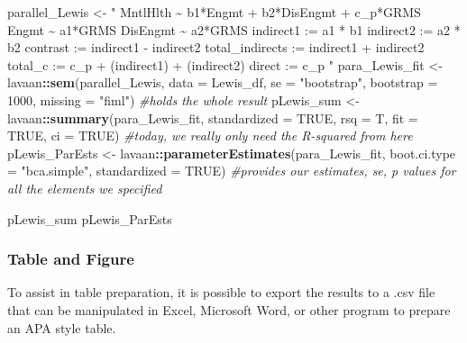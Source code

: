 \documentclass[
  11pt,
]{book}
\newenvironment{Shaded}{\begin{snugshade}}{\end{snugshade}}
\newcommand{\AttributeTok}[1]{\textcolor[rgb]{0.27,0.27,0.27}{#1}}
\newcommand{\CommentTok}[1]{\textcolor[rgb]{0.37,0.37,0.37}{\textit{#1}}}
\newcommand{\ConstantTok}[1]{\textcolor[rgb]{0.37,0.37,0.37}{#1}}
\newcommand{\DecValTok}[1]{\textcolor[rgb]{0.06,0.06,0.06}{#1}}
\newcommand{\FunctionTok}[1]{\textcolor[rgb]{0.27,0.27,0.27}{\textbf{#1}}}
\newcommand{\NormalTok}[1]{#1}
\newcommand{\OtherTok}[1]{\textcolor[rgb]{0.37,0.37,0.37}{#1}}
\newcommand{\SpecialCharTok}[1]{\textcolor[rgb]{0.43,0.43,0.43}{\textbf{#1}}}
\newcommand{\StringTok}[1]{\textcolor[rgb]{0.5,0.5,0.5}{#1}}
\begin{document}
\begin{Shaded}
\begin{Highlighting}[]
\NormalTok{parallel\_Lewis }\OtherTok{\textless{}{-}} \StringTok{"}
\StringTok{    MntlHlth \textasciitilde{} b1*Engmt + b2*DisEngmt + c\_p*GRMS}
\StringTok{    Engmt \textasciitilde{} a1*GRMS    }
\StringTok{    DisEngmt \textasciitilde{} a2*GRMS}
\StringTok{    indirect1 := a1 * b1}
\StringTok{    indirect2 := a2 * b2}
\StringTok{    contrast := indirect1 {-} indirect2}
\StringTok{    total\_indirects := indirect1 + indirect2}
\StringTok{    total\_c := c\_p + (indirect1) + (indirect2)}
\StringTok{    direct := c\_p}
\StringTok{"}
\NormalTok{para\_Lewis\_fit }\OtherTok{\textless{}{-}}\NormalTok{ lavaan}\SpecialCharTok{::}\FunctionTok{sem}\NormalTok{(parallel\_Lewis, }\AttributeTok{data =}\NormalTok{ Lewis\_df, }\AttributeTok{se =} \StringTok{"bootstrap"}\NormalTok{,}
    \AttributeTok{bootstrap =} \DecValTok{1000}\NormalTok{, }\AttributeTok{missing =} \StringTok{"fiml"}\NormalTok{)  }\CommentTok{\#holds the \textquotesingle{}whole\textquotesingle{} result}
\NormalTok{pLewis\_sum }\OtherTok{\textless{}{-}}\NormalTok{ lavaan}\SpecialCharTok{::}\FunctionTok{summary}\NormalTok{(para\_Lewis\_fit, }\AttributeTok{standardized =} \ConstantTok{TRUE}\NormalTok{, }\AttributeTok{rsq =}\NormalTok{ T,}
    \AttributeTok{fit =} \ConstantTok{TRUE}\NormalTok{, }\AttributeTok{ci =} \ConstantTok{TRUE}\NormalTok{)  }\CommentTok{\#today, we really only need the R{-}squared from here    }
\NormalTok{pLewis\_ParEsts }\OtherTok{\textless{}{-}}\NormalTok{ lavaan}\SpecialCharTok{::}\FunctionTok{parameterEstimates}\NormalTok{(para\_Lewis\_fit, }\AttributeTok{boot.ci.type =} \StringTok{"bca.simple"}\NormalTok{,}
    \AttributeTok{standardized =} \ConstantTok{TRUE}\NormalTok{)  }\CommentTok{\#provides our estimates, se, p values for all the elements we specified}

\NormalTok{pLewis\_sum}
\NormalTok{pLewis\_ParEsts}
\end{Highlighting}
\end{Shaded}

\hypertarget{table-and-figure}{%
\subsubsection{Table and Figure}\label{table-and-figure}}

To assist in table preparation, it is possible to export the results to a .csv file that can be manipulated in Excel, Microsoft Word, or other program to prepare an APA style table.
\end{document}
